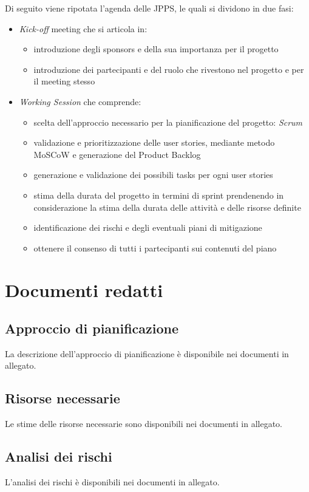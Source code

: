 Di seguito viene ripotata l'agenda delle JPPS, le quali si dividono in due fasi:
\begin{itemize}
    \item \textit{Kick-off} meeting che si articola in:
    \begin{itemize}
        \item introduzione degli sponsors e della sua importanza per il progetto
        \item introduzione dei partecipanti e del ruolo che rivestono nel progetto e per il 
        meeting stesso
    \end{itemize}
    \item \textit{Working Session} che comprende:
    \begin{itemize}
        \item scelta dell'approccio necessario per la pianificazione del progetto: 
        \textit{Scrum}
        \item validazione e prioritizzazione delle user stories, mediante metodo MoSCoW e 
        generazione del Product Backlog
        \item generazione e validazione dei possibili tasks per ogni user stories
        \item stima della durata del progetto in termini di sprint prendenendo in considerazione 
        la stima della durata delle attività e delle risorse definite
        \item identificazione dei rischi e degli eventuali piani di mitigazione
        \item ottenere il consenso di tutti i partecipanti sui contenuti del piano
    \end{itemize}
\end{itemize}


\section{Documenti redatti}

\subsection{Approccio di pianificazione}
La descrizione dell'approccio di pianificazione è disponibile nei documenti in allegato.

\subsection{Risorse necessarie}
Le stime delle risorse necessarie sono disponibili nei documenti in allegato.

\subsection{Analisi dei rischi}
L'analisi dei rischi è disponibili nei documenti in allegato.
